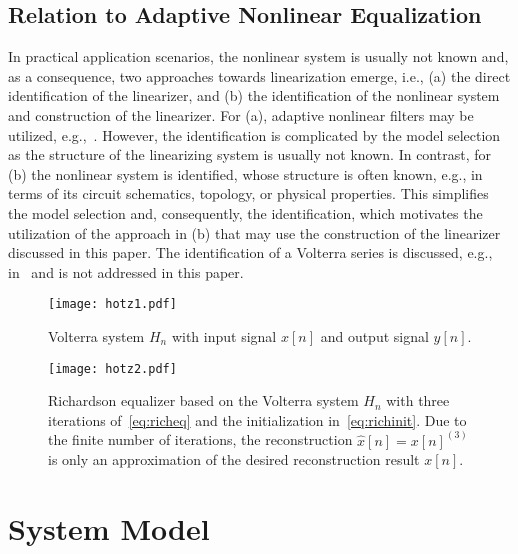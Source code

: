 \documentclass[10pt,twocolumn,twoside]{IEEEtran}
\begin{document}
\subsection{Relation to Adaptive Nonlinear Equalization}

In practical application scenarios, the nonlinear system is usually not
known and, as a consequence, two approaches towards linearization emerge, i.e.,
(a) the direct identification of the linearizer, and
(b) the identification of the nonlinear system and construction
of the linearizer. For (a), adaptive nonlinear filters may be utilized, e.g.,~\cite{mathews1991}.
However, the identification is complicated by the model selection as
the structure of the linearizing system is usually not known.
In contrast, for (b) the nonlinear system is identified,
whose structure is often known, e.g., in terms of its circuit schematics,
topology, or physical properties. This simplifies the model selection and,
consequently, the identification, which motivates the utilization of the
approach in (b) that may use the construction of the linearizer
discussed in this paper. The identification of a Volterra series is discussed, e.g.,
in~\cite{mathews2000,glentis1999,nemeth2002,weng2006,giannakis2001}
and is not addressed in this paper. 

\begin{figure}[!t]
	\centering
	\texttt{[image: hotz1.pdf]}
	\caption{Volterra system $H_n$ with input signal $x[n]$ and output signal $y[n]$.}
	\label{fig:volterrasystem}
\end{figure}

\begin{figure*}[!t]
	\centering
	\texttt{[image: hotz2.pdf]}
	\caption{Richardson equalizer based on the Volterra system $H_n$
		with three iterations of~\eqref{eq:richeq} and the initialization in~\eqref{eq:richinit}.
		Due to the finite number of iterations, the reconstruction $\hat{x}[n]=x[n]^{(3)}$ is only an approximation
		of the desired reconstruction result $x[n]$.}
	\label{fig:richeq}
\end{figure*}



\section{System Model}
	\label{model}
\end{document}
